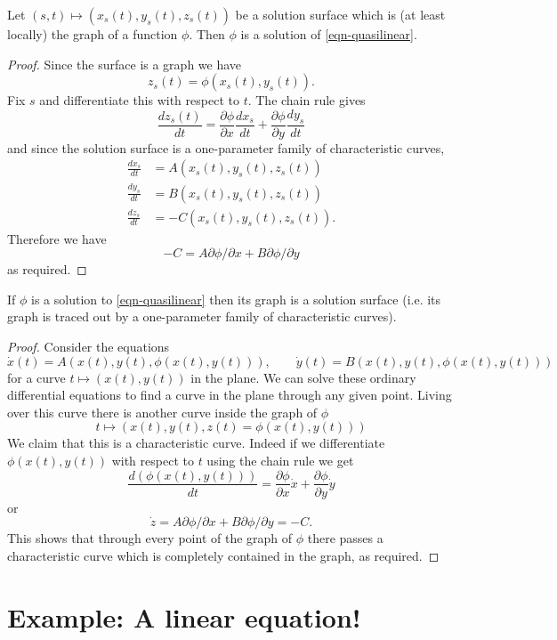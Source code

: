 \begin{thm}\label{thm:solsurf}
Let $(s,t)\mapsto(x_s(t),y_s(t),z_s(t))$ be a solution surface which is (at least locally) the graph of a function $\phi$. Then $\phi$ is a solution of \eqref{eqn-quasilinear}.
\end{thm}
\begin{proof}
Since the surface is a graph we have
\[z_s(t)=\phi(x_s(t),y_s(t)).\]
Fix $s$ and differentiate this with respect to $t$. The chain rule gives
\[\frac{dz_s(t)}{dt}=\frac{\partial\phi}{\partial x}\frac{dx_s}{dt}+\frac{\partial\phi}{\partial y}\frac{dy_s}{dt}\]
and since the solution surface is a one-parameter family of characteristic curves,
\begin{align*}
\frac{dx_s}{dt}&=A(x_s(t),y_s(t),z_s(t))\\
\frac{dy_s}{dt}&=B(x_s(t),y_s(t),z_s(t))\\
\frac{dz_s}{dt}&=-C(x_s(t),y_s(t),z_s(t)).
\end{align*}
Therefore we have
\[-C=A\partial\phi/\partial x+B\partial\phi/\partial y\]
as required.
\end{proof}
\begin{thm}
If $\phi$ is a solution to \eqref{eqn-quasilinear} then its graph is a solution surface (i.e. its graph is traced out by a one-parameter family of characteristic curves).
\end{thm}
\begin{proof}
Consider the equations
\[\dot{x}(t)=A(x(t),y(t),\phi(x(t),y(t))),\qquad\dot{y}(t)=B(x(t),y(t),\phi(x(t),y(t)))\]
for a curve $t\mapsto(x(t),y(t))$ in the plane. We can solve these ordinary differential equations to find a curve in the plane through any given point. Living over this curve there is another curve inside the graph of $\phi$
\[t\mapsto(x(t),y(t),z(t)=\phi(x(t),y(t)))\]
We claim that this is a characteristic curve. Indeed if we differentiate $\phi(x(t),y(t))$ with respect to $t$ using the chain rule we get
\[\frac{d(\phi(x(t),y(t)))}{dt}=\frac{\partial\phi}{\partial x}\dot{x}+\frac{\partial\phi}{\partial y}\dot{y}\]
or
\[\dot{z}=A\partial\phi/\partial x+B\partial\phi/\partial y=-C.\]
This shows that through every point of the graph of $\phi$ there passes a characteristic curve which is completely contained in the graph, as required.
\end{proof}

\section{Example: A linear equation!}


